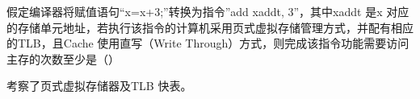 \question 假定编译器将赋值语句``x=x+3;''转换为指令''add xaddt, 3''，其中xaddt 是x
对应的存储单元地址，若执行该指令的计算机采用页式虚拟存储管理方式，并配有相应的TLB，且Cache
使用直写（Write
Through）方式，则完成该指令功能需要访问主存的次数至少是（）
\par{}
\begin{solution}考察了页式虚拟存储器及TLB 快表。
\end{solution}
